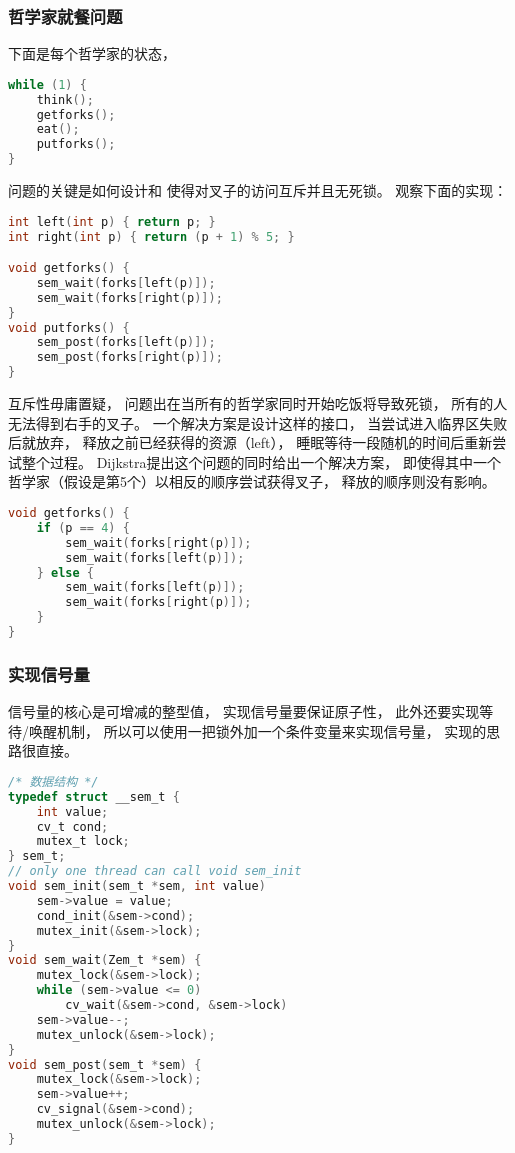 \subsubsection{哲学家就餐问题}
下面是每个哲学家的状态，
\begin{lstlisting}[language=C]
while (1) {
	think();
	getforks();
	eat();
	putforks();
}
\end{lstlisting}
问题的关键是如何设计和
使得对叉子的访问互斥并且无死锁。
观察下面的实现：
\begin{lstlisting}[language=C]
int left(int p) { return p; }
int right(int p) { return (p + 1) % 5; }

void getforks() {
	sem_wait(forks[left(p)]);
	sem_wait(forks[right(p)]);
}
void putforks() {
	sem_post(forks[left(p)]);
	sem_post(forks[right(p)]);
}
\end{lstlisting}
互斥性毋庸置疑，
问题出在当所有的哲学家同时开始吃饭将导致死锁，
所有的人无法得到右手的叉子。
一个解决方案是设计这样的接口，
当尝试进入临界区失败后就放弃，
释放之前已经获得的资源（left），
睡眠等待一段随机的时间后重新尝试整个过程。
Dijkstra提出这个问题的同时给出一个解决方案，
即使得其中一个哲学家（假设是第5个）以相反的顺序尝试获得叉子，
释放的顺序则没有影响。
\begin{lstlisting}[language=C]
void getforks() {
	if (p == 4) {
		sem_wait(forks[right(p)]);
		sem_wait(forks[left(p)]);
	} else {
		sem_wait(forks[left(p)]);
		sem_wait(forks[right(p)]);
	}
}
\end{lstlisting}

\subsubsection{实现信号量}
信号量的核心是可增减的整型值，
实现信号量要保证原子性，
此外还要实现等待/唤醒机制，
所以可以使用一把锁外加一个条件变量来实现信号量，
实现的思路很直接。
\begin{lstlisting}[language=C]
/* 数据结构 */
typedef struct __sem_t {
	int value;
	cv_t cond;
	mutex_t lock;
} sem_t;
// only one thread can call void sem_init
void sem_init(sem_t *sem, int value)
	sem->value = value;
	cond_init(&sem->cond);
	mutex_init(&sem->lock);
}
void sem_wait(Zem_t *sem) {
	mutex_lock(&sem->lock);
	while (sem->value <= 0)
		cv_wait(&sem->cond, &sem->lock)
	sem->value--;
	mutex_unlock(&sem->lock);
}
void sem_post(sem_t *sem) {
	mutex_lock(&sem->lock);
	sem->value++;
	cv_signal(&sem->cond);
	mutex_unlock(&sem->lock);
}
\end{lstlisting}
